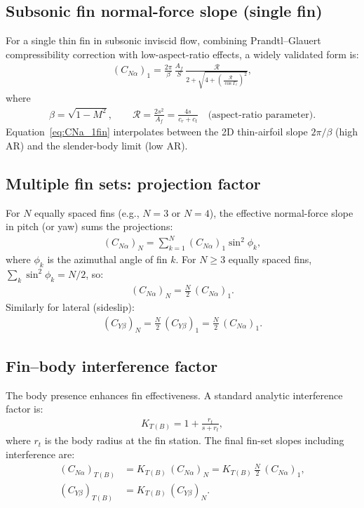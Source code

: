 \documentclass[11pt]{article}
\begin{document}
\subsection{Subsonic fin normal-force slope (single fin)}
For a single thin fin in subsonic inviscid flow, combining Prandtl--Glauert compressibility correction with low-aspect-ratio effects, a widely validated form is:
\begin{align}
\label{eq:CNa_1fin}
(C_{N\alpha})_1 = \frac{2\pi}{\beta}\,\frac{A_f}{S}\,\frac{\mathcal{R}}{2+\sqrt{4+\left(\frac{\mathcal{R}}{\cos\Gamma_c}\right)^2}},
\end{align}
where
\begin{align}
\beta = \sqrt{1-M^2},\qquad
\mathcal{R} = \frac{2s^2}{A_f} = \frac{4s}{c_r+c_t} \quad \text{(aspect-ratio parameter)}.
\end{align}
Equation~\eqref{eq:CNa_1fin} interpolates between the 2D thin-airfoil slope $2\pi/\beta$ (high AR) and the slender-body limit (low AR).

\subsection{Multiple fin sets: projection factor}
For $N$ equally spaced fins (e.g., $N=3$ or $N=4$), the effective normal-force slope in pitch (or yaw) sums the projections:
\begin{align}
(C_{N\alpha})_N = \sum_{k=1}^N (C_{N\alpha})_1 \sin^2\phi_k,
\end{align}
where $\phi_k$ is the azimuthal angle of fin $k$. For $N\ge 3$ equally spaced fins, $\sum_k \sin^2\phi_k = N/2$, so:
\begin{align}
\label{eq:CNa_Nfins}
(C_{N\alpha})_N = \frac{N}{2}\,(C_{N\alpha})_1.
\end{align}
Similarly for lateral (sideslip):
\begin{align}
(C_{Y\beta})_N = \frac{N}{2}\,(C_{Y\beta})_1 = \frac{N}{2}\,(C_{N\alpha})_1.
\end{align}

\subsection{Fin--body interference factor}
The body presence enhances fin effectiveness. A standard analytic interference factor is:
\begin{align}
\label{eq:KTB}
K_{T(B)} = 1 + \frac{r_t}{s+r_t},
\end{align}
where $r_t$ is the body radius at the fin station. The final fin-set slopes including interference are:
\begin{align}
\label{eq:CNa_fin_final}
(C_{N\alpha})_{T(B)} &= K_{T(B)}\,(C_{N\alpha})_N = K_{T(B)}\,\frac{N}{2}\,(C_{N\alpha})_1,\\
(C_{Y\beta})_{T(B)} &= K_{T(B)}\,(C_{Y\beta})_N.
\end{align}
\end{document}
